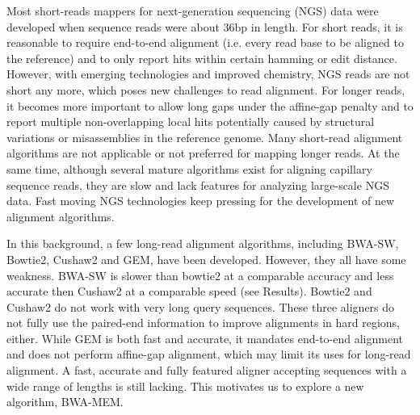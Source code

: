 \documentclass{bioinfo}
\begin{document}
Most short-reads mappers for next-generation sequencing (NGS) data were developed
when sequence reads were about 36bp in length. For short reads, it is reasonable
to require end-to-end alignment (i.e. every read base to be aligned to the
reference) and to only report hits within certain hamming or edit distance.
However, with emerging technologies and improved chemistry, NGS reads are not
short any more, which poses new challenges to read alignment. For longer reads,
it becomes more important to allow long gaps under the affine-gap penalty and
to report multiple non-overlapping local hits potentially caused by structural
variations or misassemblies in the reference genome. Many short-read alignment
algorithms are not applicable or not preferred for mapping longer reads. At the
same time, although several mature algorithms exist for aligning capillary
sequence reads, they are slow and lack features for analyzing large-scale NGS
data. Fast moving NGS technologies keep pressing for the development of new
alignment algorithms.

In this background, a few long-read alignment algorithms, including BWA-SW,
Bowtie2, Cushaw2 and GEM, have been developed. However, they all have some
weakness. BWA-SW is slower than bowtie2 at a comparable accuracy and less
accurate then Cushaw2 at a comparable speed (see Results). Bowtie2 and Cushaw2
do not work with very long query sequences. These three aligners do not fully
use the paired-end information to improve alignments in hard regions, either.
While GEM is both fast and accurate, it mandates end-to-end alignment and does
not perform affine-gap alignment, which may limit its uses for long-read
alignment. A fast, accurate and fully featured aligner accepting sequences
with a wide range of lengths is still lacking. This motivates us to explore
a new algorithm, BWA-MEM.
\end{document}
